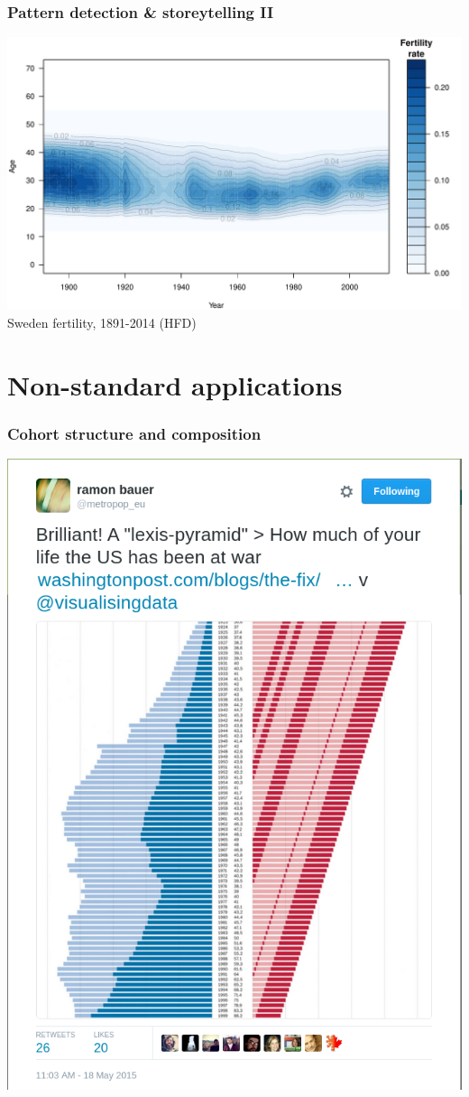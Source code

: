 \documentclass[20pt]{beamer}
\begin{document}
\begin{frame}
\frametitle{Pattern detection \& storeytelling II}
\includegraphics[scale=.85]{Figures/FertAPC.pdf}\\
Sweden fertility, 1891-2014 (HFD)
\end{frame}

\section{Non-standard applications}
\begin{frame}
\frametitle{Cohort structure and composition}
\includegraphics[scale=.55]{Figures/WPLexisPyramid.png}
\end{frame}
\end{document}
